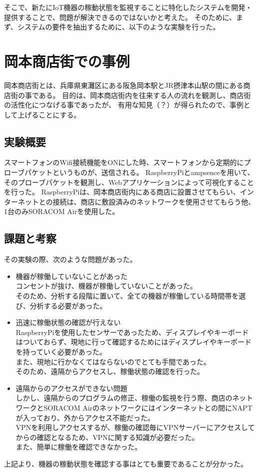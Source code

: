 そこで、新たにIoT機器の稼動状態を監視することに特化したシステムを開発・提供することで、問題が解決できるのではないかと考えた。
そのために、まず、システムの要件を抽出するために、以下のような実験を行った。

\section{岡本商店街での事例}
岡本商店街とは、兵庫県東灘区にある阪急岡本駅とJR摂津本山駅の間にある商店街の事である。
目的は、岡本商店街内を往来する人の流れを観測し、商店街の活性化につなげる事であったが、
有用な知見（？）が得られたので、事例として上げることにする。

\subsection{実験概要}
スマートフォンのWifi接続機能をONにした時、スマートフォンから定期的にプローブパケットというものが、送信される。
RaspberryPiとampsenceを用いて、そのプローブパケットを観測し、Webアプリケーションによって可視化することを行った。
RaspberryPiは、岡本商店街内にある商店に設置させてもらい、インターネットとの接続は、商店に敷設済みのネットワークを使用させてもらう他、1台のみSORACOM Airを使用した。

\subsection{課題と考察}
その実験の際、次のような問題があった。
\begin{itemize}
	\item 機器が稼働していないことがあった\\
		コンセントが抜け、機器が稼働していないことがあった。\\
		そのため、分析する段階に置いて、全ての機器が稼働している時間帯を選び、分析する必要があった。
	\item 迅速に稼働状態の確認が行えない\\
		RaspberryPiを使用したセンサーであったため、ディスプレイやキーボードはついておらず、現地に行って確認するためにはディスプレイやキーボードを持っていく必要があった。\\
		また、現地に行かなくてはならないのでとても手間であった。\\
		そのため、遠隔からアクセスし、稼働状態の確認を行った。
	\item 遠隔からのアクセスができない問題\\
		しかし、遠隔からのプログラムの修正、稼働の監視を行う際、商店のネットワークとSORACOM Airのネットワークにはインターネットとの間にNAPTが入っており、外からアクセス不能だった。\\
		VPNを利用しアクセスするが、稼働の確認毎にVPNサーバーにアクセスしてからの確認となるため、VPNに関する知識が必要だった。\\
		また、簡単に稼働を確認できなかった。
\end{itemize}
上記より、機器の稼動状態を確認する事はとても重要であることが分かった。


